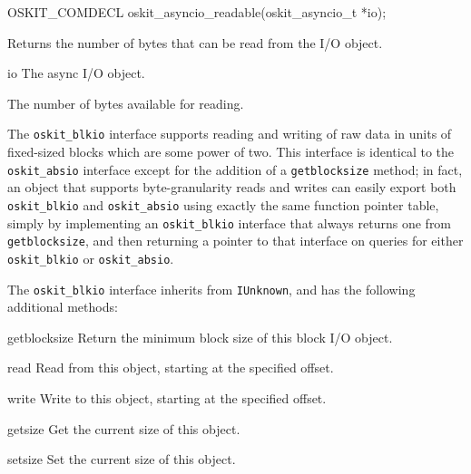 \begin{apisyn}

	\funcproto OSKIT_COMDECL
	oskit_asyncio_readable(oskit_asyncio_t *io);
\end{apisyn}
\begin{apidesc}
	Returns the number of bytes that can be read from the I/O object.
\end{apidesc}
\begin{apiparm}
	\item[io]
		The async I/O object.
\end{apiparm}
\begin{apiret}
	The number of bytes available for reading.
\end{apiret}


\label{oskit-blkio}

The {\tt oskit_blkio} interface supports reading and writing of raw data
in units of fixed-sized blocks which are some power of two.
This interface is identical to the {\tt oskit_absio} interface
except for the addition of a \texttt{getblocksize} method;
in fact, an object that supports byte-granularity reads and writes
can easily export both {\tt oskit_blkio} and {\tt oskit_absio}
using exactly the same function pointer table,
simply by implementing an {\tt oskit_blkio} interface
that always returns one from \texttt{getblocksize},
and then returning a pointer to that interface
on queries for either {\tt oskit_blkio} or {\tt oskit_absio}.

The {\tt oskit_blkio} interface inherits from {\tt IUnknown},
and has the following additional methods:	
\begin{icsymlist}
\item[getblocksize]
	Return the minimum block size of this block I/O object.
\item[read]
	Read from this object, starting at the specified offset.
\item[write]
	Write to this object, starting at the specified offset.
\item[getsize]
	Get the current size of this object.
\item[setsize]
	Set the current size of this object.
\end{icsymlist}


